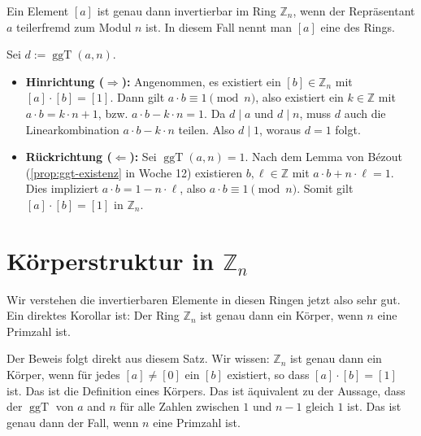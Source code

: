 \begin{math-stroke}

\begin{explanation-of-steps}
Ein Element $[a]$ ist genau dann invertierbar im Ring $\mathbb{Z}_n$, wenn der Repräsentant $a$ teilerfremd zum Modul $n$ ist. In diesem Fall nennt man $[a]$ eine  des Rings.
\end{explanation-of-steps}
\end{math-stroke}

\begin{math-stroke}
\begin{short-proof}
Sei $d := \operatorname{ggT}(a, n)$.

\begin{itemize}
    \item \textbf{Hinrichtung ($\Rightarrow$):} Angenommen, es existiert ein $[b] \in \mathbb{Z}_n$ mit $[a] \cdot [b] = [1]$. Dann gilt $a \cdot b \equiv 1 \pmod n$, also existiert ein $k \in \mathbb{Z}$ mit $a \cdot b = k \cdot n + 1$, bzw. $a \cdot b - k \cdot n = 1$. Da $d \mid a$ und $d \mid n$, muss $d$ auch die Linearkombination $a \cdot b - k \cdot n$ teilen. Also $d \mid 1$, woraus $d = 1$ folgt.
    \item \textbf{Rückrichtung ($\Leftarrow$):} Sei $\operatorname{ggT}(a, n) = 1$. Nach dem Lemma von Bézout (\cref{prop:ggt-existenz} in Woche 12) existieren $b, \ell \in \mathbb{Z}$ mit $a \cdot b + n \cdot \ell = 1$. Dies impliziert $a \cdot b = 1 - n \cdot \ell$, also $a \cdot b \equiv 1 \pmod n$. Somit gilt $[a] \cdot [b] = [1]$ in $\mathbb{Z}_n$.
\end{itemize}
\end{short-proof}
\end{math-stroke}

\section{Körperstruktur in \texorpdfstring{$\mathbb{Z}_n$}{Zn}}

\begin{spoken-clean}[00:30:44 - 00:32:41]
Wir verstehen die invertierbaren Elemente in diesen Ringen jetzt also sehr gut. Ein direktes Korollar ist: Der Ring $\mathbb{Z}_n$ ist genau dann ein Körper, wenn $n$ eine Primzahl ist.

Der Beweis folgt direkt aus diesem Satz. Wir wissen: $\mathbb{Z}_n$ ist genau dann ein Körper, wenn für jedes $[a] \neq [0]$ ein $[b]$ existiert, so dass $[a] \cdot [b] = [1]$ ist. Das ist die Definition eines Körpers. Das ist äquivalent zu der Aussage, dass der $\operatorname{ggT}$ von $a$ and $n$ für alle Zahlen zwischen $1$ und $n - 1$ gleich $1$ ist. Das ist genau dann der Fall, wenn $n$ eine Primzahl ist.
\end{spoken-clean}

